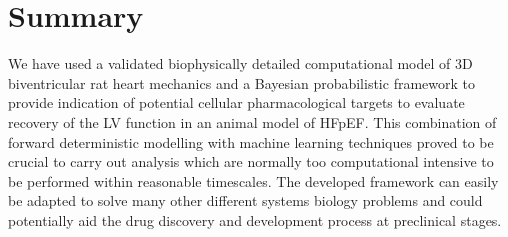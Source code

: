 %
%
%
\section{Summary}\label{sec:ch7summary}
We have used a validated biophysically detailed computational model of $3$D biventricular rat heart mechanics and a Bayesian probabilistic framework to provide indication of potential cellular pharmacological targets to evaluate recovery of the LV function in an animal model of HFpEF. This combination of forward deterministic modelling with machine learning techniques proved to be crucial to carry out analysis which are normally too computational intensive to be performed within reasonable timescales. The developed framework can easily be adapted to solve many other different systems biology problems and could potentially aid the drug discovery and development process at preclinical stages.